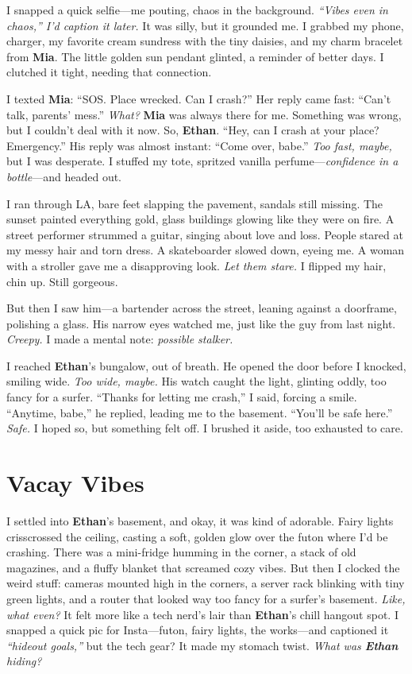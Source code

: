 \documentclass{article}
\begin{document}
I snapped a quick selfie—me pouting, chaos in the background. \textit{“Vibes even in chaos,” I’d caption it later.} It was silly, but it grounded me. I grabbed my phone, charger, my favorite cream sundress with the tiny daisies, and my charm bracelet from \textbf{Mia}. The little golden sun pendant glinted, a reminder of better days. I clutched it tight, needing that connection.

I texted \textbf{Mia}: “SOS. Place wrecked. Can I crash?” Her reply came fast: “Can’t talk, parents’ mess.” \textit{What?} \textbf{Mia} was always there for me. Something was wrong, but I couldn’t deal with it now. So, \textbf{Ethan}. “Hey, can I crash at your place? Emergency.” His reply was almost instant: “Come over, babe.” \textit{Too fast, maybe,} but I was desperate. I stuffed my tote, spritzed vanilla perfume—\textit{confidence in a bottle}—and headed out.

I ran through LA, bare feet slapping the pavement, sandals still missing. The sunset painted everything gold, glass buildings glowing like they were on fire. A street performer strummed a guitar, singing about love and loss. People stared at my messy hair and torn dress. A skateboarder slowed down, eyeing me. A woman with a stroller gave me a disapproving look. \textit{Let them stare.} I flipped my hair, chin up. Still gorgeous.

But then I saw him—a bartender across the street, leaning against a doorframe, polishing a glass. His narrow eyes watched me, just like the guy from last night. \textit{Creepy.} I made a mental note: \textit{possible stalker.}

I reached \textbf{Ethan}’s bungalow, out of breath. He opened the door before I knocked, smiling wide. \textit{Too wide, maybe.} His watch caught the light, glinting oddly, too fancy for a surfer. “Thanks for letting me crash,” I said, forcing a smile. “Anytime, babe,” he replied, leading me to the basement. “You’ll be safe here.” \textit{Safe.} I hoped so, but something felt off. I brushed it aside, too exhausted to care.

\section*{Vacay Vibes}

I settled into \textbf{Ethan}’s basement, and okay, it was kind of adorable. Fairy lights crisscrossed the ceiling, casting a soft, golden glow over the futon where I’d be crashing. There was a mini-fridge humming in the corner, a stack of old magazines, and a fluffy blanket that screamed cozy vibes. But then I clocked the weird stuff: cameras mounted high in the corners, a server rack blinking with tiny green lights, and a router that looked way too fancy for a surfer’s basement. \textit{Like, what even?} It felt more like a tech nerd’s lair than \textbf{Ethan}’s chill hangout spot. I snapped a quick pic for Insta—futon, fairy lights, the works—and captioned it \textit{“hideout goals,”} but the tech gear? It made my stomach twist. \textit{What was \textbf{Ethan} hiding?}
\end{document}

